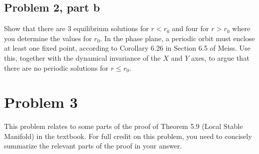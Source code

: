 \newpage
\subsection{Problem 2, part b}
Show that there are 3 equilibrium solutions for $r < r_0$ and four for $r > r_0$ where you determine the values for $r_0$. In the phase plane, a periodic orbit must enclose at least one fixed point, according to Corollary 6.26 in Section 6.5 of Meiss. Use this, together with the dynamical invariance of the $X$ and $Y$ axes, to argue that there are no periodic solutions for $r \leq r_0$.



\newpage
\section{Problem 3}
This problem relates to some parts of the proof of Theorem 5.9 (Local Stable Manifold) in the textbook. For full credit on this problem, you need to concisely summarize the relevant parts of the proof in your answer.  

